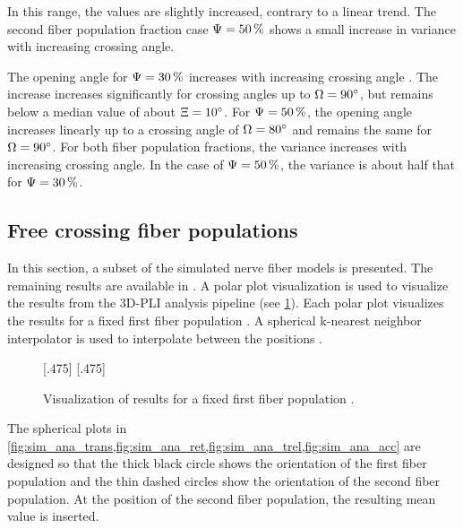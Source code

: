 In this range, the \trel{} values are slightly increased, contrary to a linear trend.
The second fiber population fraction case $\textnormal{$\Psi$} = \SI{50}{\percent}$ shows a small increase in variance with increasing crossing angle.
\par
The opening angle \openingAngle{} for $\textnormal{$\Psi$}=\SI{30}{\percent}$ increases with increasing crossing angle \modelOmega{}.
The increase increases significantly for crossing angles up to $\textnormal{$\Omega$}=\SI{90}{\degree}$, but remains below a median value of about $\textnormal{$\Xi$}=\SI{10}{\degree}$.
For $\textnormal{$\Psi$}=\SI{50}{\percent}$, the opening angle increases linearly up to a crossing angle of $\textnormal{$\Omega$}=\SI{80}{\degree}$ and remains the same for $\textnormal{$\Omega$}=\SI{90}{\degree}$.
For both fiber population fractions, the variance increases with increasing crossing angle.
In the case of $\textnormal{$\Psi$}=\SI{50}{\percent}$, the variance is about half that for $\textnormal{$\Psi$}=\SI{30}{\percent}$.
%
% 
% 
\subsection{Free crossing fiber populations}
\label{sec:resFreeCross}
%
In this section, a subset of the simulated nerve fiber models is presented.
The remaining results are available in .
A polar plot visualization is used to visualize the results from the \ac{3D-PLI} analysis pipeline (see \cref{fig:simModelSphereSample}).
Each polar plot visualizes the results for a fixed first fiber population \popa{}.
A spherical k-nearest neighbor interpolator is used to interpolate between the positions \cite{DBLP:journals/corr/abs-1910-00704}.
% 
\begin{figure}[t]
\centering
\setlength{\tikzwidth}{0.40\textwidth}
[.475\textwidth]{}
\hfill
{}
[.475\textwidth]{}
\caption{Visualization of results for a fixed first fiber population \popa{}.}
\label{fig:simModelSphereSample}
\end{figure}
%
The spherical plots in \cref{fig:sim_ana_trans,fig:sim_ana_ret,fig:sim_ana_trel,fig:sim_ana_acc} are designed so that the thick black circle shows the orientation of the first fiber population and the thin dashed circles show the orientation of the second fiber population.
At the position of the second fiber population, the resulting mean value is inserted.
%
%
%
